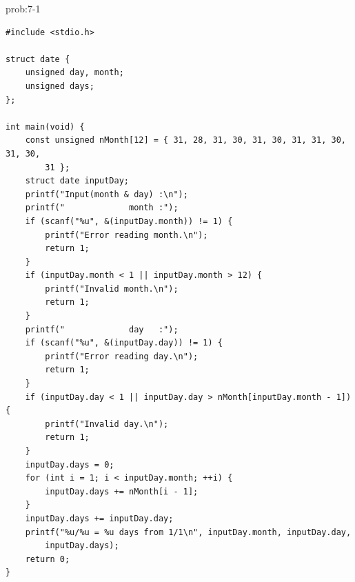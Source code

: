 \begin{renshuu-answer}{prob:7-1}
\baselineskip=12pt
\begin{verbatim}
#include <stdio.h>

struct date {
    unsigned day, month;
    unsigned days;
};

int main(void) {
    const unsigned nMonth[12] = { 31, 28, 31, 30, 31, 30, 31, 31, 30, 31, 30,
        31 };
    struct date inputDay;
    printf("Input(month & day) :\n");
    printf("             month :");
    if (scanf("%u", &(inputDay.month)) != 1) {
        printf("Error reading month.\n");
        return 1;
    }
    if (inputDay.month < 1 || inputDay.month > 12) {
        printf("Invalid month.\n");
        return 1;
    }
    printf("             day   :");
    if (scanf("%u", &(inputDay.day)) != 1) {
        printf("Error reading day.\n");
        return 1;
    }
    if (inputDay.day < 1 || inputDay.day > nMonth[inputDay.month - 1]) {
        printf("Invalid day.\n");
        return 1;
    }
    inputDay.days = 0;
    for (int i = 1; i < inputDay.month; ++i) {
        inputDay.days += nMonth[i - 1];
    }
    inputDay.days += inputDay.day;
    printf("%u/%u = %u days from 1/1\n", inputDay.month, inputDay.day,
        inputDay.days);
    return 0;
}
\end{verbatim}
\end{renshuu-answer}
